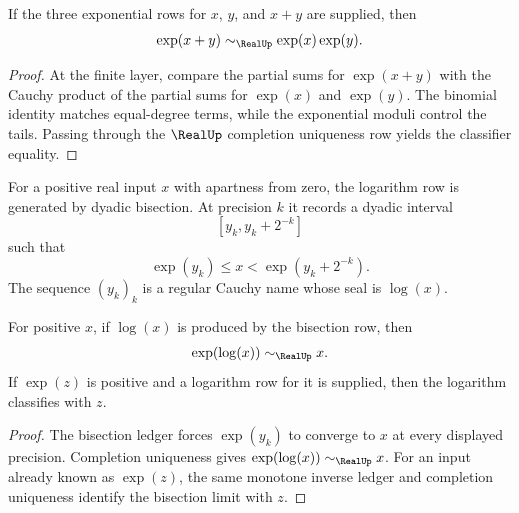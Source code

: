 \begin{theorem}
\label{thm:analysis-spine-exp-additivity}
If the three exponential rows for $x$, $y$, and $x+y$ are supplied, then
$$
\exp(x+y)\sim_{\RealUp}\exp(x)\exp(y).
$$
\end{theorem}

\begin{proof}
At the finite layer, compare the partial sums for $\exp(x+y)$ with the
Cauchy product of the partial sums for $\exp(x)$ and $\exp(y)$.  The binomial
identity matches equal-degree terms, while the exponential moduli control the
tails.  Passing through the $\RealUp$ completion uniqueness row yields the
classifier equality.
\end{proof}

\begin{definition}
\label{def:analysis-spine-log}
For a positive real input $x$ with apartness from zero, the logarithm row is
generated by dyadic bisection.  At precision $k$ it records a dyadic interval
$$
[y_k,y_k+2^{-k}]
$$
such that
$$
\exp(y_k)\le x<\exp(y_k+2^{-k}).
$$
The sequence $(y_k)_k$ is a regular Cauchy name whose seal is $\log(x)$.
\end{definition}

\begin{theorem}
\label{thm:analysis-spine-log-exp-inverse}
For positive $x$, if $\log(x)$ is produced by the bisection row, then
$$
\exp(\log(x))\sim_{\RealUp}x.
$$
If $\exp(z)$ is positive and a logarithm row for it is supplied, then the
logarithm classifies with $z$.
\end{theorem}

\begin{proof}
The bisection ledger forces $\exp(y_k)$ to converge to $x$ at every displayed
precision.  Completion uniqueness gives $\exp(\log(x))\sim_{\RealUp}x$.
For an input already known as $\exp(z)$, the same monotone inverse ledger and
completion uniqueness identify the bisection limit with $z$.
\end{proof}

